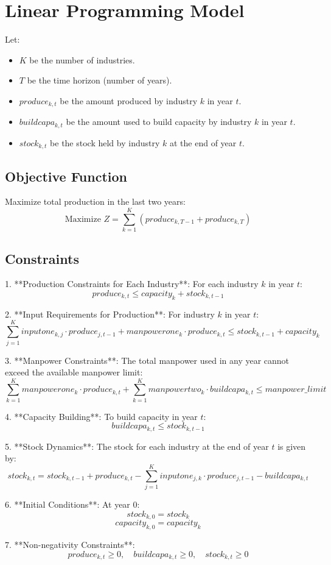\documentclass{article}
\begin{document}
\section*{Linear Programming Model}

Let:
\begin{itemize}
    \item \( K \) be the number of industries.
    \item \( T \) be the time horizon (number of years).
    \item \( produce_{k,t} \) be the amount produced by industry \( k \) in year \( t \).
    \item \( buildcapa_{k,t} \) be the amount used to build capacity by industry \( k \) in year \( t \).
    \item \( stock_{k,t} \) be the stock held by industry \( k \) at the end of year \( t \).
\end{itemize}

\subsection*{Objective Function}

Maximize total production in the last two years:
\[
\text{Maximize } Z = \sum_{k=1}^{K} (produce_{k,T-1} + produce_{k,T})
\]

\subsection*{Constraints}

1. **Production Constraints for Each Industry**:
   For each industry \( k \) in year \( t \):
   \[
   produce_{k,t} \leq capacity_{k} + stock_{k,t-1}
   \]

2. **Input Requirements for Production**:
   For industry \( k \) in year \( t \):
   \[
   \sum_{j=1}^{K} inputone_{k,j} \cdot produce_{j,t-1} + manpowerone_{k} \cdot produce_{k,t} \leq stock_{k,t-1} + capacity_{k}
   \]

3. **Manpower Constraints**:
   The total manpower used in any year cannot exceed the available manpower limit:
   \[
   \sum_{k=1}^{K} manpowerone_{k} \cdot produce_{k,t} + \sum_{k=1}^{K} manpowertwo_{k} \cdot buildcapa_{k,t} \leq manpower\_limit
   \]

4. **Capacity Building**:
   To build capacity in year \( t \):
   \[
   buildcapa_{k,t} \leq stock_{k,t-1}
   \]

5. **Stock Dynamics**:
   The stock for each industry at the end of year \( t \) is given by:
   \[
   stock_{k,t} = stock_{k,t-1} + produce_{k,t} - \sum_{j=1}^{K} inputone_{j,k} \cdot produce_{j,t-1} - buildcapa_{k,t}
   \]

6. **Initial Conditions**:
   At year \( 0 \):
   \[
   stock_{k,0} = stock_{k}
   \]
   \[
   capacity_{k,0} = capacity_{k}
   \]

7. **Non-negativity Constraints**:
   \[
   produce_{k,t} \geq 0, \quad buildcapa_{k,t} \geq 0, \quad stock_{k,t} \geq 0
   \]
\end{document}
